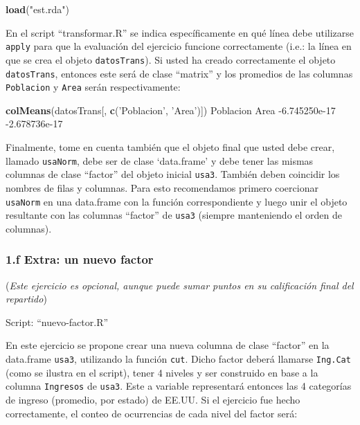 \documentclass[]{article}
\newenvironment{Shaded}{}{}
\newcommand{\KeywordTok}[1]{\textcolor[rgb]{0.00,0.44,0.13}{\textbf{{#1}}}}
\newcommand{\FloatTok}[1]{\textcolor[rgb]{0.25,0.63,0.44}{{#1}}}
\newcommand{\StringTok}[1]{\textcolor[rgb]{0.25,0.44,0.63}{{#1}}}
\newcommand{\NormalTok}[1]{{#1}}
\begin{document}
\begin{Shaded}
\begin{Highlighting}[]
\KeywordTok{load}\NormalTok{(}\StringTok{"est.rda"}\NormalTok{)}
\end{Highlighting}
\end{Shaded}
En el script ``transformar.R'' se indica específicamente en qué línea
debe utilizarse \texttt{apply} para que la evaluación del ejercicio
funcione correctamente (i.e.: la línea en que se crea el objeto
\texttt{datosTrans}). Si usted ha creado correctamente el objeto
\texttt{datosTrans}, entonces este será de clase ``matrix'' y los
promedios de las columnas \texttt{Poblacion} y \texttt{Area} serán
respectivamente:

\begin{Shaded}
\begin{Highlighting}[]
\KeywordTok{colMeans}\NormalTok{(datosTrans[, }\KeywordTok{c}\NormalTok{(}\StringTok{'Poblacion'}\NormalTok{, }\StringTok{'Area'}\NormalTok{)])}
    \NormalTok{Poblacion          Area }
\NormalTok{-}\FloatTok{6.745250e-17} \NormalTok{-}\FloatTok{2.678736e-17}
\end{Highlighting}
\end{Shaded}
Finalmente, tome en cuenta también que el objeto final que usted debe
crear, llamado \texttt{usaNorm}, debe ser de clase `data.frame' y debe
tener las mismas columnas de clase ``factor'' del objeto inicial
\texttt{usa3}. También deben coincidir los nombres de filas y columnas.
Para esto recomendamos primero coercionar \texttt{usaNorm} en una
data.frame con la función correspondiente y luego unir el objeto
resultante con las columnas ``factor'' de \texttt{usa3} (siempre
manteniendo el orden de columnas).

\subsubsection{1.f Extra: un nuevo factor}

(\emph{Este ejercicio es opcional, aunque puede sumar puntos en su
calificación final del repartido})

Script: ``nuevo-factor.R''

En este ejercicio se propone crear una nueva columna de clase ``factor''
en la data.frame \texttt{usa3}, utilizando la función \texttt{cut}.
Dicho factor deberá llamarse \texttt{Ing.Cat} (como se ilustra en el
script), tener 4 niveles y ser construido en base a la columna
\texttt{Ingresos} de \texttt{usa3}. Este a variable representará
entonces las 4 categorías de ingreso (promedio, por estado) de EE.UU. Si
el ejercicio fue hecho correctamente, el conteo de ocurrencias de cada
nivel del factor será:
\end{document}
